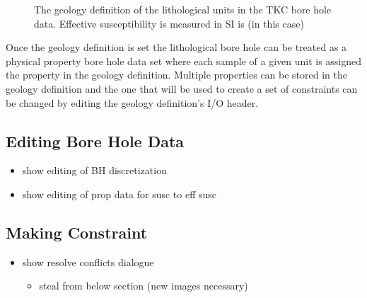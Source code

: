  \begin{figure} [h]
    \centering
    \caption{The geology definition of the lithological units in the TKC bore hole data. Effective susceptibility is measured in SI is (in this case)}
    \label{fig:geoDefBH}
\end{figure}

Once the geology definition is set the lithological bore hole can be treated as a physical property bore hole data set where each sample of a given unit is assigned the property in the geology definition. Multiple properties can be stored in the geology definition and the one that will be used to create a set of constraints can be changed by editing the geology definition's I/O header.

\subsection{Editing Bore Hole Data}
\label{subsec:visBH}

\begin{itemize}
 \item show editing of BH discretization
 \item show editing of prop data for susc to eff susc
\end{itemize}

\subsection{Making Constraint}
\label{subsec:makeConstBH}

\begin{itemize}
 \item show resolve conflicts dialogue
 \begin{itemize}
  \item steal from below section (new images necessary)
 \end{itemize}
\end{itemize}

